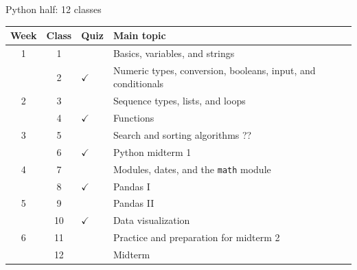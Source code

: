 \documentclass[aspectratio=169,11pt]{beamer}
\begin{document}
\begin{frame}{Python half: 12 classes}
  \small
  \begin{tabular}{ccll}
    \toprule
    Week & Class & Quiz & Main topic \\
    \midrule
    1 & 1  &           & Basics, variables, and strings \\
      & 2  & $\checkmark$ & Numeric types, conversion, booleans, input, and conditionals \\
    2 & 3  &           & Sequence types, lists, and loops \\
      & 4  & $\checkmark$ & Functions \\
    3 & 5  &           & Search and sorting algorithms ?? \\
      & 6  & $\checkmark$ & Python midterm 1 \\
    4 & 7  &           & Modules, dates, and the \texttt{math} module \\
      & 8  & $\checkmark$ & Pandas I \\
    5 & 9  &           & Pandas II \\
      & 10 & $\checkmark$ & Data visualization \\
    6 & 11 &          & Practice and preparation for midterm 2 \\
      & 12 &          & Midterm \\
    \bottomrule
  \end{tabular}
\end{frame}
\end{document}
